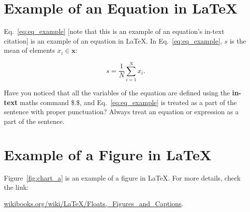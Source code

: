 \section{Example of an Equation in \LaTeX}
Eq.~\ref{eq:eq_example} [note that this is an example of an equation's in-text citation] is an example of an equation in \LaTeX. In Eq.~\eqref{eq:eq_example}, $ s $ is the mean of elements $ x_i \in \mathbf{x} $: 

\begin{equation}
\label{eq:eq_example} %
s = \frac{1}{N} \sum_{i = 1}^{N} x_i. 
\end{equation}

Have you noticed that all the variables of the equation are defined using the \textbf{in-text} maths command \$.\$, and Eq.~\eqref{eq:eq_example} is treated as a part of the sentence with proper punctuation? Always treat an equation or expression as a part of the sentence. 

\section{Example of a Figure in \LaTeX}
Figure~\ref{fig:chart_a} is an example of a figure in \LaTeX. For more details, check the link:

\href{https://en.wikibooks.org/wiki/LaTeX/Floats,_Figures_and_Captions}{wikibooks.org/wiki/LaTeX/Floats,\_Figures\_and\_Captions}.

